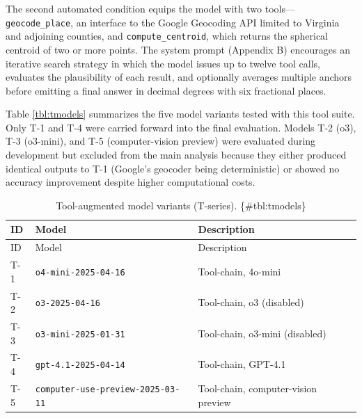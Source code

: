 \documentclass[
  11pt,
]{article}
\begin{document}
The second automated condition equips the model with two
tools---\texttt{geocode\_place}, an interface to the Google Geocoding
API limited to Virginia and adjoining counties, and
\texttt{compute\_centroid}, which returns the spherical centroid of two
or more points. The system prompt (Appendix B) encourages an iterative
search strategy in which the model issues up to twelve tool calls,
evaluates the plausibility of each result, and optionally averages
multiple anchors before emitting a final answer in decimal degrees with
six fractional places.

Table \autoref{tbl:tmodels} summarizes the five model variants tested
with this tool suite. Only T-1 and T-4 were carried forward into the
final evaluation. Models T-2 (o3), T-3 (o3-mini), and T-5
(computer-vision preview) were evaluated during development but excluded
from the main analysis because they either produced identical outputs to
T-1 (Google's geocoder being deterministic) or showed no accuracy
improvement despite higher computational costs.

\begin{longtable}[]{@{}
  >{\raggedright\arraybackslash}p{}
  >{\raggedright\arraybackslash}p{}
  >{\raggedright\arraybackslash}p{}@{}}
\caption{Tool-augmented model variants (T-series).
\{\#tbl:tmodels\}}\tabularnewline
\toprule\noalign{}
\begin{minipage}[b]{\linewidth}\raggedright
ID
\end{minipage} & \begin{minipage}[b]{\linewidth}\raggedright
Model
\end{minipage} & \begin{minipage}[b]{\linewidth}\raggedright
Description
\end{minipage} \\
\midrule\noalign{}
\endfirsthead
\toprule\noalign{}
\begin{minipage}[b]{\linewidth}\raggedright
ID
\end{minipage} & \begin{minipage}[b]{\linewidth}\raggedright
Model
\end{minipage} & \begin{minipage}[b]{\linewidth}\raggedright
Description
\end{minipage} \\
\midrule\noalign{}
\endhead
\bottomrule\noalign{}
\endlastfoot
T-1 & \texttt{o4-mini-2025-04-16} & Tool-chain, 4o-mini \\
T-2 & \texttt{o3-2025-04-16} & Tool-chain, o3 (disabled) \\
T-3 & \texttt{o3-mini-2025-01-31} & Tool-chain, o3-mini (disabled) \\
T-4 & \texttt{gpt-4.1-2025-04-14} & Tool-chain, GPT-4.1 \\
T-5 & \texttt{computer-use-preview-2025-03-11} & Tool-chain,
computer-vision preview \\
\end{longtable}
\end{document}
